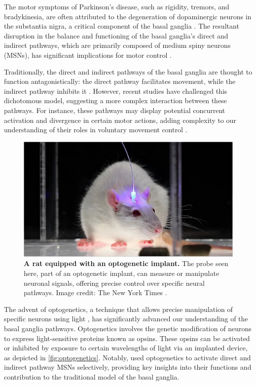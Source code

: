 \documentclass[10pt]{article}
\begin{document}
\begin{sloppypar}
  The motor symptoms of Parkinson’s disease, such as rigidity, tremors, and bradykinesia, are often attributed to the degeneration of dopaminergic neurons in the substantia nigra, a critical component of the basal ganglia \citep{abedini_cooccurrence_2015}. The resultant disruption in the balance and functioning of the basal ganglia’s direct and indirect pathways, which are primarily composed of medium spiny neurons (MSNs), has significant implications for motor control \citep{abedini_cooccurrence_2015,ojagbemi_neuropsychiatric_2013}.

  Traditionally, the direct and indirect pathways of the basal ganglia are thought to function antagonistically: the direct pathway facilitates movement, while the indirect pathway inhibits it \citep{isett_indirect_2022}. However, recent studies have challenged this dichotomous model, suggesting a more complex interaction between these pathways. For instance, these pathways may display potential concurrent activation and divergence in certain motor actions, adding complexity to our understanding of their roles in voluntary movement control \citep{perez_striatal_2017}.

  \begin{figure}[ht]
    \centering
    \includegraphics[width=\textwidth]{figures/optogenetics.png}
    \caption[A rat equipped with an optogenetic implant]{\textbf{A rat equipped with an optogenetic implant.} The probe seen here, part of an optogenetic implant, can measure or manipulate neuronal signals, offering precise control over specific neural pathways. Image credit: The New York Times \citep{belluck_risky_2016}.}
    \label{fig:optogenetics}
  \end{figure}

  The advent of optogenetics, a technique that allows precise manipulation of specific neurons using light \citep{deisseroth_next-generation_2006}, has significantly advanced our understanding of the basal ganglia pathways. Optogenetics involves the genetic modification of neurons to express light-sensitive proteins known as opsins. These opsins can be activated or inhibited by exposure to certain wavelengths of light via an implanted device, as depicted in \autoref{fig:optogenetics}. Notably, \cite{kravitz_regulation_2010} used optogenetics to activate direct and indirect pathway MSNs selectively, providing key insights into their functions and contribution to the traditional model of the basal ganglia.


\end{sloppypar}
\end{document}
